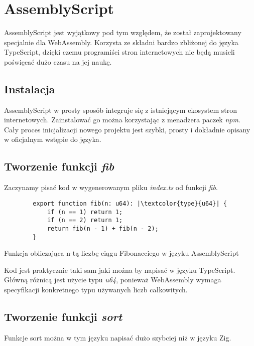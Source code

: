 \documentclass[language=polish,type=master]{aghmodern}
\begin{document}
\section{AssemblyScript}
AssemblyScript jest wyjątkowy pod tym względem, że został zaprojektowany specjalnie dla WebAssembly.
Korzysta ze składni bardzo zbliżonej do języka TypeScript, dzięki czemu programiści stron internetowych nie będą musieli poświęcać dużo czasu na jej naukę.

\subsection{Instalacja}
AssemblyScript w prosty sposób integruje się z istniejącym ekosystem stron internetowych.
Zainstalować go można korzystając z menadżera paczek \emph{npm}.
Cały proces inicjalizacji nowego projektu jest szybki, prosty i dokładnie opisany w oficjalnym wstępie do języka\footnotemark{}.

\subsection{Tworzenie funkcji \emph{fib}}
Zaczynamy pisać kod w wygenerowanym pliku \emph{index.ts} od funkcji \emph{fib}.

\begin{listing}[H]
    \begin{verbatim}
        export function fib(n: u64): |\textcolor{type}{u64}| {
            if (n == 1) return 1;
            if (n == 2) return 1;
            return fib(n - 1) + fib(n - 2);
        }
    \end{verbatim}
    \caption{Funkcja obliczająca n-tą liczbę ciągu Fibonacciego w języku AssemblyScript}
\end{listing}

Kod jest praktycznie taki sam jaki można by napisać w języku TypeScript.
Główną różnicą jest użycie typu \emph{u64}, ponieważ WebAssembly wymaga specyfikacji konkretnego typu używanych liczb całkowitych.

\subsection{Tworzenie funkcji \emph{sort}}

Funkcje sort można w tym języku napisać dużo szybciej niż w języku Zig.
\end{document}
